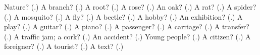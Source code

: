\begin{tcolorbox}[breakable,colback=teal!4,colframe=teal!35!black,title={Before you move on}]
Nature? (\textbf{}.) A branch? (\textbf{}.) A root? (\textbf{}.) A rose? (\textbf{}.) An oak? (\textbf{}.) A rat? (\textbf{}.) A spider? (\textbf{}.) A mosquito? (\textbf{}.) A fly? (\textbf{}.) A beetle? (\textbf{}.) A hobby? (\textbf{}.) An exhibition? (\textbf{}.) A play? (\textbf{}.) A guitar? (\textbf{}.) A piano? (\textbf{}.) A passenger? (\textbf{}.) A carriage? (\textbf{}.) A transfer? (\textbf{}.) A traffic jam; a cork? (\textbf{}.) An accident? (\textbf{}.) Young people? (\textbf{}.) A citizen? (\textbf{}.) A foreigner? (\textbf{}.) A tourist? (\textbf{}.) A text? (\textbf{}.)
\end{tcolorbox}
